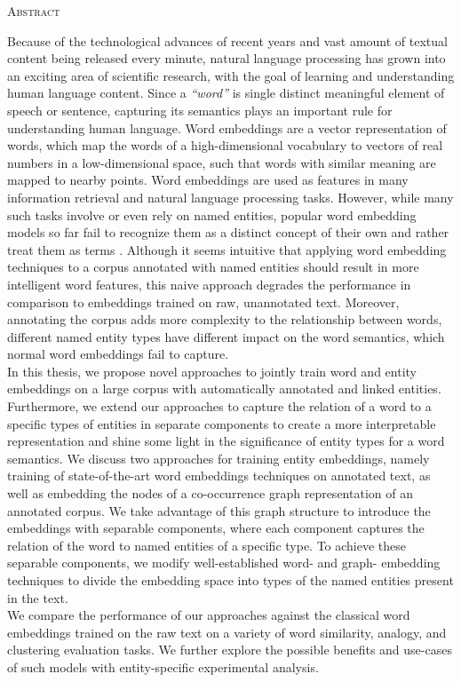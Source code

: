 \begin{center}
  \textsc{Abstract}
\end{center}
%
\noindent
%
Because of the technological advances of recent years and vast amount of textual content being released every minute, natural language processing has grown into an exciting area of scientific research, with the goal of learning and understanding human language content. Since a \emph{``word''} is single distinct meaningful element of speech or sentence, capturing its semantics plays an important rule for understanding human language. Word embeddings are a vector representation of words, which map the words of a high-dimensional vocabulary to vectors of real numbers in a low-dimensional space, such that words with similar meaning are mapped to nearby points. Word embeddings are used as features in many information retrieval and natural language processing tasks. However, while many such tasks involve or even rely on named entities, popular word embedding models so far fail to recognize them as a distinct concept of their own and rather treat them as terms . Although it seems intuitive that applying word embedding techniques to a corpus annotated with named entities should result in more intelligent word features, this naive approach  degrades the performance in comparison to embeddings trained on raw, unannotated text. Moreover, annotating the corpus adds more complexity to the relationship between words, different named entity types have different impact on the word semantics, which normal word embeddings fail to capture.
\\
In this thesis, we propose novel approaches to jointly train word and entity embeddings on a large corpus with automatically annotated and linked entities. Furthermore, we extend our approaches to capture the relation of a word to a specific types of entities in separate components to create a more interpretable representation and shine some light in the significance of entity types for a word semantics. We discuss two approaches for training entity embeddings, namely training of state-of-the-art word embeddings techniques on annotated text, as well as embedding the nodes of a co-occurrence graph representation of an annotated corpus. We take advantage of this graph structure to introduce the embeddings with separable components, where each component captures the relation of the word to named entities of a specific type. To achieve these separable components, we modify well-established word- and graph- embedding techniques to divide the embedding space into types of the named entities present in the text. \\
We compare the performance of our approaches against the classical word embeddings trained on the raw text on a variety of word similarity, analogy, and clustering evaluation tasks. We further explore the possible benefits and use-cases of such  models with entity-specific experimental analysis. 

